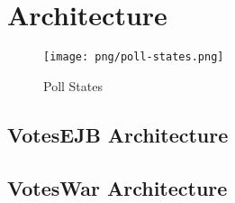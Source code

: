 \section{Architecture}

\begin{figure}
\centering
\texttt{[image: png/poll-states.png]}
\caption{Poll States}
\end{figure}


\subsection{VotesEJB Architecture}
\subsection{VotesWar Architecture}